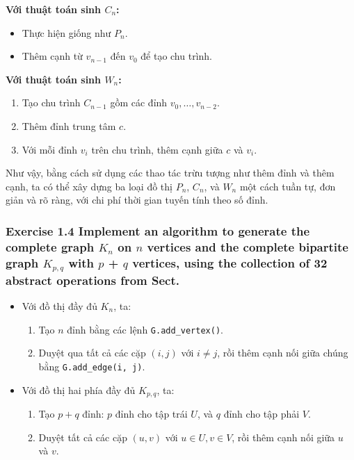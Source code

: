 \documentclass{article}
\begin{document}
	\textbf{Với thuật toán sinh $C_n$:}
	\begin{itemize}
		\item Thực hiện giống như $P_n$.
		\item Thêm cạnh từ $v_{n-1}$ đến $v_0$ để tạo chu trình.
	\end{itemize}
	
	\textbf{Với thuật toán sinh $W_n$:}
	\begin{enumerate}
		\item Tạo chu trình $C_{n-1}$ gồm các đỉnh $v_0, \ldots, v_{n-2}$.
		\item Thêm đỉnh trung tâm $c$.
		\item Với mỗi đỉnh $v_i$ trên chu trình, thêm cạnh giữa $c$ và $v_i$.
	\end{enumerate}
	
	Như vậy, bằng cách sử dụng các thao tác trừu tượng như thêm đỉnh và thêm cạnh, ta có thể xây dựng ba loại đồ thị $P_n$, $C_n$, và $W_n$ một cách tuần tự, đơn giản và rõ ràng, với chi phí thời gian tuyến tính theo số đỉnh.
	
	\subsubsection*{Exercise 1.4 Implement an algorithm to generate the complete graph $K_n$ on $n$ vertices and the complete bipartite graph $K_{p,q}$ with $p$ + $q$ vertices, using the collection of 32 abstract operations from Sect.}
	
	\begin{itemize}
		\item Với đồ thị đầy đủ \(K_n\), ta:
		\begin{enumerate}
			\item Tạo \(n\) đỉnh bằng các lệnh \texttt{G.add\_vertex()}.
			\item Duyệt qua tất cả các cặp \((i, j)\) với \(i \ne j\), rồi thêm cạnh nối giữa chúng bằng \texttt{G.add\_edge(i, j)}.
		\end{enumerate}
		
		\item Với đồ thị hai phía đầy đủ \(K_{p,q}\), ta:
		\begin{enumerate}
			\item Tạo \(p+q\) đỉnh: \(p\) đỉnh cho tập trái \(U\), và \(q\) đỉnh cho tập phải \(V\).
			\item Duyệt tất cả các cặp \((u, v)\) với \(u \in U, v \in V\), rồi thêm cạnh nối giữa \(u\) và \(v\).
		\end{enumerate}
	\end{itemize}
	
\end{document}
